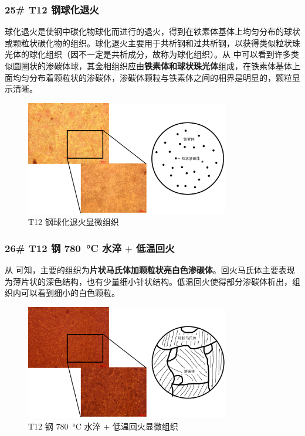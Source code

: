 \documentclass[a4paper,utf8]{article}
\begin{document}
        \subsubsection{25\# T12 钢球化退火}
            球化退火是使钢中碳化物球化而进行的退火，得到在铁素体基体上均匀分布的球状或颗粒状碳化物的组织。球化退火主要用于共析钢和过共析钢，以获得类似粒状珠光体的球化组织（因不一定是共析成分，故称为球化组织）。从 中可以看到许多类似圆圈状的渗碳体球，其金相组织应由\textbf{铁素体和球状珠光体}组成，在铁素体基体上面均匀分布着颗粒状的渗碳体，渗碳体颗粒与铁素体之间的相界是明显的，颗粒显示清晰。
            \begin{figure}[!ht]
                \includegraphics[height=50mm]{result/12.pdf}
                \caption{T12 钢球化退火显微组织\label{fig:12}}
            \end{figure}

        \subsubsection{26\# T12 钢 \SI{780}{\degreeCelsius} 水淬 $+$ 低温回火\label{ss2:t12_780}}
            从 可知，主要的组织为\textbf{片状马氏体加颗粒状亮白色渗碳体}。回火马氏体主要表现为薄片状的深色结构，也有少量细小针状结构。低温回火使得部分渗碳体析出，组织内可以看到细小的白色颗粒。
            \begin{figure}[!ht]
                \includegraphics[height=50mm]{result/13.pdf}
                \caption{T12 钢 \SI{780}{\degreeCelsius} 水淬 $+$ 低温回火显微组织\label{fig:13}}
            \end{figure}\newpage
\end{document}
